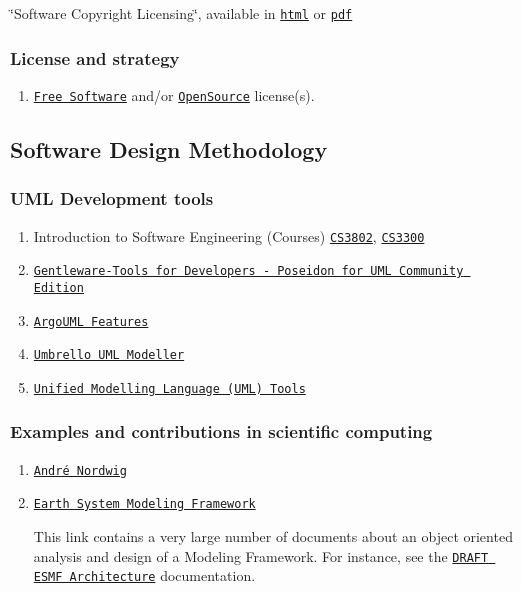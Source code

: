 \char`\"{}Software Copyright Licensing\char`\"{}, available in \href{http://www.ipr-helpdesk.org/docs/docs.EN/softwareCopyrightLicensing.html}{\tt html} or \href{http://www.ipr-helpdesk.org/docs/docs.EN/softwareCopyrightLicensing.pdf}{\tt pdf}\hypertarget{developments_sub2}{}\subsubsection{License and strategy}\label{developments_sub2}
\begin{enumerate}
\item \href{http://www.fsf.org/philosophy/license-list.html}{\tt Free Software} and/or \href{http://www.opensource.org/licenses/}{\tt Open\-Source} license(s).\end{enumerate}
\hypertarget{developments_softwareDesign}{}\subsection{Software Design Methodology}\label{developments_softwareDesign}
\hypertarget{developments_uml}{}\subsubsection{UML Development tools}\label{developments_uml}
\begin{enumerate}
\item Introduction to Software Engineering (Courses) \href{http://www.cc.gatech.edu/classes/AY2000/cs3802_fall/}{\tt CS3802}, \href{http://www.cc.gatech.edu/classes/AY2001/cs3300_fall/}{\tt CS3300}\item \href{http://www.gentleware.com/products/poseidonCE.php3}{\tt Gentleware-Tools for Developers - Poseidon for UML Community Edition}\item \href{http://argouml.tigris.org/features.html#XMI}{\tt Argo\-UML Features}\item \href{http://uml.sourceforge.net/index.php}{\tt Umbrello UML Modeller}\item \href{http://www.jeckle.de/umltools.htm}{\tt Unified Modelling Language (UML) Tools}\end{enumerate}
\hypertarget{developments_expl}{}\subsubsection{Examples and contributions in scientific computing}\label{developments_expl}
\begin{enumerate}
\item \href{http://swt.cs.tu-berlin.de/%7Enordwig/}{\tt Andr\'{e} Nordwig}\item \href{http://www.esmf.ucar.edu/}{\tt Earth System Modeling Framework}\par
 This link contains a very large number of documents about an object oriented analysis and design of a Modeling Framework. For instance, see the \href{http://www.esmf.ucar.edu/esmf_docs/ESMF_archdoc/ESMF_archdoc.html}{\tt DRAFT ESMF Architecture} documentation.\end{enumerate}
